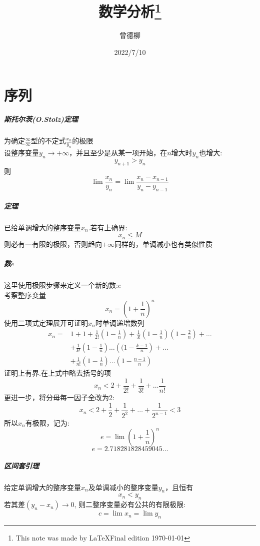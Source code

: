 \documentclass[12pt,a4paper]{report}
\begin{document}
    \title{数学分析\thanks{This note was made by \LaTeX \quad Final edition \today}}
    \date{2022/7/10}
    \author{曾德柳}
    \maketitle
\tableofcontents{}
\chapter{序列}
\paragraph{斯托尔茨(O.Stolz)定理}
    为确定$\frac{\infty}{\infty}$型的不定式$\frac{x_n}{y_n}$的极限\\
    设整序变量$y_n\rightarrow +\infty$，并且至少是从某一项开始，在$n$增大时$y_n$也增大:
    $$y_{n+1} >y_n$$
    则
    $$\lim\frac{x_n}{y_n} =\lim\frac{x_n-x_{n-1}}{y_n-y_{n-1}}$$
\paragraph{定理}
    已给单调增大的整序变量$x_n$.若有上确界:
    $$x_n \leq M$$ 则必有一有限的极限，否则趋向$+\infty$同样的，单调减小也有类似性质
\paragraph{数$e$}
    这里使用极限步骤来定义一个新的数:$e$\\
    \quad 考察整序变量$$x_n=\left(1+\frac{1}{n}\right)^{n}$$
    使用二项式定理展开可证明$x_n$时单调递增数列
    \begin{align*}
        x_n=&1+1+\frac{1}{2!}\left(1-\frac{1}{n}\right)+\frac{1}{3!}\left(1-\frac{1}{n}\right)\left(1-\frac{2}{n}\right)+\dots \\
            &+\frac{1}{k!}\left(1-\frac{1}{n}\right)\dots \left((1-\frac{k-1}{n}\right)+\dots \\
            &+\frac{1}{n!}\left(1-\frac{1}{n}\right)\dots \left(1-\frac{n-1}{n}\right)
    \end{align*}
    证明上有界.在上式中略去括号的项
    $$x_n<2+\frac{1}{2!}+\frac{1}{3!}+\dots \frac{1}{n!}$$
    更进一步，将分母每一因子全改为2:
    $$x_n<2+\frac{1}{2}+\frac{1}{2^2}+\dots +\frac{1}{2^{n-1}}<3$$
    所以$x_n$有极限，记为:
    $$e=\lim \left(1+\frac{1}{n}\right)^n$$
    $$e=2.718281828459045\dots$$
\paragraph{区间套引理}
    给定单调增大的整序变量$x_n$及单调减小的整序变量$y_n$，且恒有$$x_n<y_n$$
    若其差$(y_n-x_n) \rightarrow 0$, 则二整序变量必有公共的有限极限:
    $$c=\lim x_n=\lim y_n$$
\end{document}
